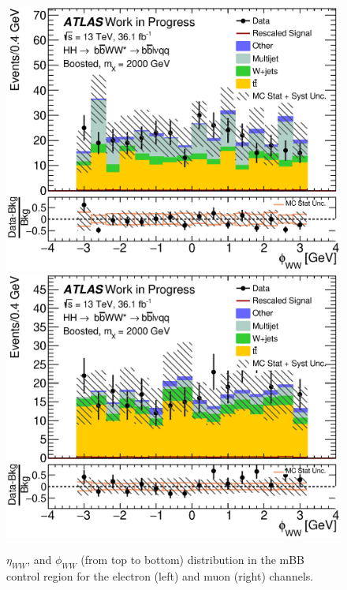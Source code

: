 \begin{figure}[h]
\begin{center}
\includegraphics[scale=0.33]{figures/kinplots/C_2tag_mbbcr_elec_presel_met50_WWPhi}
\includegraphics[scale=0.33]{figures/kinplots/C_2tag_mbbcr_muon_presel_met50_WWPhi}
\caption[Kinematic distributions in the mBB control region for the electron and muon channels]{${\eta_{WW}}$, and ${\phi_{WW}}$ (from top to bottom) distribution in the mBB control region for the electron (left) and muon (right) channels.}
\end{center}
\end{figure}
\newpage